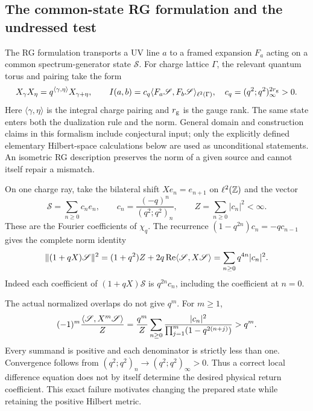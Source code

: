 \subsection{The common-state RG formulation and the undressed test}
The RG formulation \cite[Sections 1--2]{RG} transports a UV line $a$
to a framed expansion $F_a$ acting on a common spectrum-generator state
$\mathscr S$. For charge lattice $\Gamma$, the relevant quantum torus
and pairing take the form
\begin{equation}\label{eq:rg-pairing}
 X_\gamma X_\eta=q^{\langle\gamma,\eta\rangle}X_{\gamma+\eta},
 \qquad I(a,b)=c_q\langle F_a\mathscr S,F_b\mathscr S\rangle_{\ell^2(\Gamma)},
 \quad c_q=(q^2;q^2)_\infty^{2r_{\rm g}}>0.
\end{equation}
Here $\langle\gamma,\eta\rangle$ is the integral charge pairing and
$r_{\rm g}$ is the gauge rank. The same state enters both the
dualization rule and the norm. General domain and construction claims
in this formalism include conjectural input; only the explicitly
defined elementary Hilbert-space calculations below are used as
unconditional statements. An isometric RG description preserves the
norm of a given source and cannot itself repair a mismatch.

On one charge ray, take the bilateral shift $Xe_n=e_{n+1}$ on
$\ell^2(\mathbb Z)$ and the vector
\begin{equation}\label{eq:bare-state}
 \mathscr S=\sum_{n\geq0}c_ne_n,\qquad
 c_n=\frac{(-q)^n}{(q^2;q^2)_n},\qquad
 Z=\sum_{n\geq0}|c_n|^2<\infty.
\end{equation}
These are the Fourier coefficients of $\chi_q$. The recurrence
$(1-q^{2n})c_n=-qc_{n-1}$ gives the complete norm identity
\begin{equation}\label{eq:bare-norm}
 \lVert (1+qX)\mathscr S\rVert^2
 =(1+q^2)Z+2q\operatorname{Re}\langle \mathscr S,X\mathscr S\rangle
 =\sum_{n\geq0}q^{4n}|c_n|^2.
\end{equation}
Indeed each coefficient of $(1+qX)\mathscr S$ is $q^{2n}c_n$,
including the coefficient at $n=0$.

The actual normalized overlaps do not give $q^m$. For $m\geq1$,
\begin{equation}\label{eq:bare-overlap}
 (-1)^m\frac{\langle \mathscr S,X^m\mathscr S\rangle}Z
 =\frac{q^m}Z\sum_{n\geq0}
 \frac{|c_n|^2}{\prod_{j=1}^m(1-q^{2(n+j)})}>q^m.
\end{equation}
Every summand is positive and each denominator is strictly less than
one. Convergence follows from $(q^2;q^2)_n\to(q^2;q^2)_\infty>0$.
Thus a correct local difference equation does not by itself determine
the desired physical return coefficient. This exact failure motivates
changing the prepared state while retaining the positive Hilbert metric.
